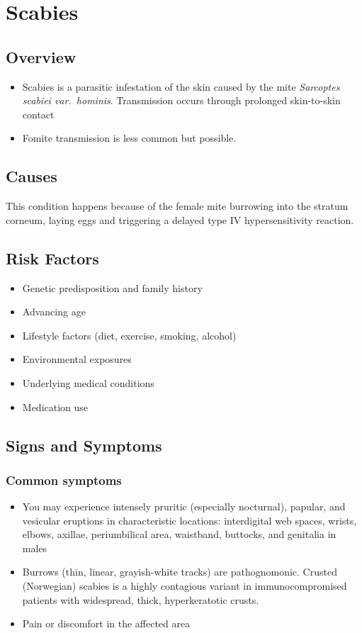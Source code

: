 \chapter{Scabies}
\label{sec:Scabies}

\section{Overview}


\begin{itemize}[noitemsep]
  \item Scabies is a parasitic infestation of the skin caused by the mite \textit{Sarcoptes scabiei var.~hominis}. Transmission occurs through prolonged skin-to-skin contact
  \item Fomite transmission is less common but possible.
\end{itemize}
\section{Causes}
This condition happens because of the female mite burrowing into the stratum corneum, laying eggs and triggering a delayed type IV hypersensitivity reaction.     
\section{Risk Factors}

\begin{itemize}[noitemsep]
  \item Genetic predisposition and family history
  \item Advancing age
  \item Lifestyle factors (diet, exercise, smoking, alcohol)
  \item Environmental exposures
  \item Underlying medical conditions
  \item Medication use
\end{itemize}
\section{Signs and Symptoms}

\subsection{Common symptoms}
\begin{itemize}[noitemsep]
  \item You may experience intensely pruritic (especially nocturnal), papular, and vesicular eruptions in characteristic locations: interdigital web spaces, wrists, elbows, axillae, periumbilical area, waistband, buttocks, and genitalia in males
  \item Burrows (thin, linear, grayish-white tracks) are pathognomonic. Crusted (Norwegian) scabies is a highly contagious variant in immunocompromised patients with widespread, thick, hyperkeratotic crusts.
  \item Pain or discomfort in the affected area
  \end{itemize}

